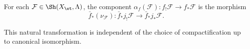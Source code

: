 \begin{definition}
For each $\mathcal{F} \in \Sh(X_{\et}, \Lambda)$, the component $\alpha_f(\mathcal{F}): f_! \mathcal{F} \to f_* \mathcal{F}$ is the morphism
$$\bar{f}_*(\nu_\mathcal{F}): \bar{f}_* j_! \mathcal{F} \longrightarrow \bar{f}_* j_* \mathcal{F}.$$

This natural transformation is independent of the choice of compactification up to canonical isomorphism.
\end{definition}
